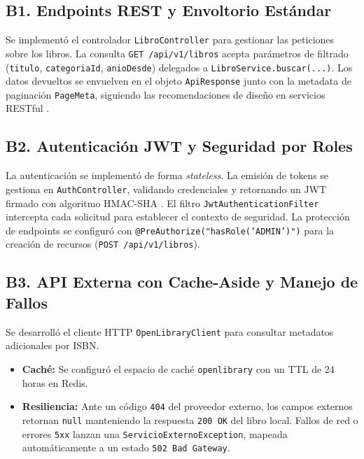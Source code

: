 \documentclass[11pt,a4paper]{article}
\begin{document}
\subsection{B1. Endpoints REST y Envoltorio Estándar}
Se implementó el controlador \texttt{LibroController} para gestionar las peticiones sobre los libros. La consulta \texttt{GET /api/v1/libros} acepta parámetros de filtrado (\texttt{titulo}, \texttt{categoriaId}, \texttt{anioDesde}) delegados a \texttt{LibroService.buscar(...)}. Los datos devueltos se envuelven en el objeto \texttt{ApiResponse} junto con la metadata de paginación \texttt{PageMeta}, siguiendo las recomendaciones de diseño en servicios RESTful \cite{pautasso2008restful}.

\subsection{B2. Autenticación JWT y Seguridad por Roles}
La autenticación se implementó de forma \textit{stateless}. La emisión de tokens se gestiona en \texttt{AuthController}, validando credenciales y retornando un JWT firmado con algoritmo HMAC-SHA \cite{taibi2020architectural}. El filtro \texttt{JwtAuthenticationFilter} intercepta cada solicitud para establecer el contexto de seguridad. La protección de endpoints se configuró con \texttt{@PreAuthorize("hasRole('ADMIN')")} para la creación de recursos (\texttt{POST /api/v1/libros}).

\subsection{B3. API Externa con Cache-Aside y Manejo de Fallos}
Se desarrolló el cliente HTTP \texttt{OpenLibraryClient} para consultar metadatos adicionales por ISBN. 
\begin{itemize}
    \item \textbf{Caché:} Se configuró el espacio de caché \texttt{openlibrary} con un TTL de 24 horas en Redis.
    \item \textbf{Resiliencia:} Ante un código \texttt{404} del proveedor externo, los campos externos retornan \texttt{null} manteniendo la respuesta \texttt{200 OK} del libro local. Fallos de red o errores \texttt{5xx} lanzan una \texttt{ServicioExternoException}, mapeada automáticamente a un estado \texttt{502 Bad Gateway}.
\end{itemize}
\end{document}
